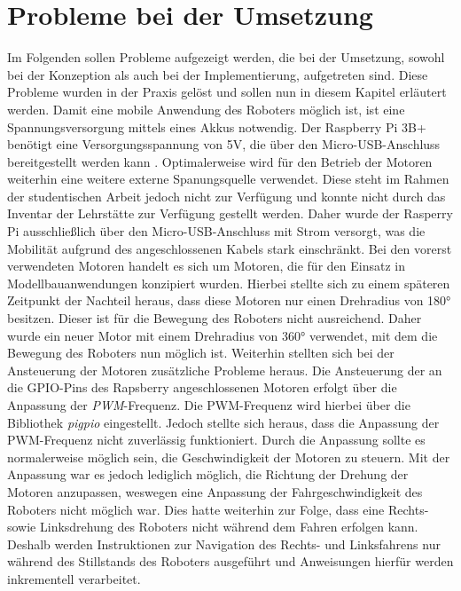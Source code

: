 \section{Probleme bei der Umsetzung}
Im Folgenden sollen Probleme aufgezeigt werden, die bei der Umsetzung, sowohl bei der Konzeption als auch bei der Implementierung, aufgetreten sind. Diese Probleme wurden in der Praxis gelöst und sollen nun in diesem Kapitel erläutert werden.
Damit eine mobile Anwendung des Roboters möglich ist, ist eine Spannungsversorgung mittels eines Akkus notwendig. Der Raspberry Pi 3B+ benötigt eine Versorgungsspannung von 5V, die  über den Micro-USB-Anschluss bereitgestellt werden kann \cite{raspberrypi-docs}. Optimalerweise wird für den Betrieb der Motoren weiterhin eine weitere externe Spanungsquelle verwendet. Diese steht im Rahmen der studentischen Arbeit jedoch nicht zur Verfügung und konnte nicht durch das Inventar der Lehrstätte zur Verfügung gestellt werden. Daher wurde der Rasperry Pi ausschließlich über den Micro-USB-Anschluss mit Strom versorgt, was die Mobilität aufgrund des angeschlossenen Kabels stark einschränkt. 
Bei den vorerst verwendeten Motoren handelt es sich um Motoren, die für den Einsatz in Modellbauanwendungen konzipiert wurden. Hierbei stellte sich zu einem späteren Zeitpunkt der Nachteil heraus, dass diese Motoren nur einen Drehradius von 180° besitzen. Dieser ist für die Bewegung des Roboters nicht ausreichend. Daher wurde ein neuer Motor mit einem Drehradius von 360° verwendet, mit dem die Bewegung des Roboters nun möglich ist.
Weiterhin stellten sich bei der Ansteuerung der Motoren zusätzliche Probleme heraus. Die Ansteuerung der an die GPIO-Pins des Rapsberry angeschlossenen Motoren erfolgt über die Anpassung der \textit{PWM}-Frequenz. Die PWM-Frequenz wird hierbei über die Bibliothek \textit{pigpio} eingestellt. Jedoch stellte sich heraus, dass die Anpassung der PWM-Frequenz nicht zuverlässig funktioniert. Durch die Anpassung sollte es normalerweise möglich sein, die Geschwindigkeit der Motoren zu steuern. Mit der Anpassung war es jedoch lediglich möglich, die Richtung der Drehung der Motoren anzupassen, weswegen eine Anpassung der Fahrgeschwindigkeit des Roboters nicht möglich war. Dies hatte weiterhin zur Folge, dass eine Rechts- sowie Linksdrehung des Roboters nicht während dem Fahren erfolgen kann. Deshalb werden Instruktionen zur Navigation des Rechts- und Linksfahrens nur während des Stillstands des Roboters ausgeführt und Anweisungen hierfür werden inkrementell verarbeitet.